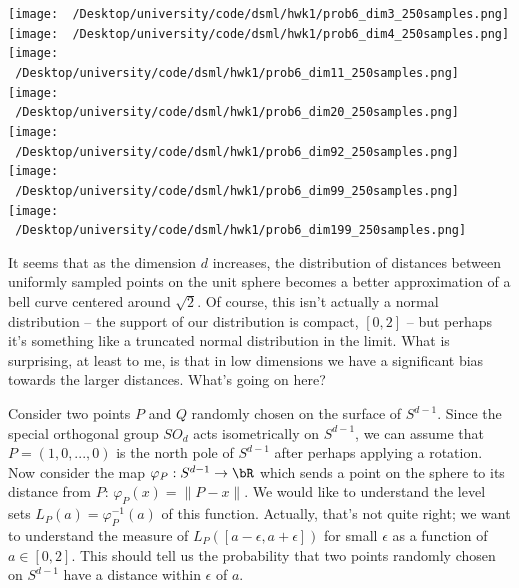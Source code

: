 \begin{homework}[e]
\begin{soln}
\begin{center}
      \texttt{[image: ~/Desktop/university/code/dsml/hwk1/prob6\_dim3\_250samples.png]}
      \texttt{[image: ~/Desktop/university/code/dsml/hwk1/prob6\_dim4\_250samples.png]}
      \texttt{[image: ~/Desktop/university/code/dsml/hwk1/prob6\_dim11\_250samples.png]}
      \texttt{[image: ~/Desktop/university/code/dsml/hwk1/prob6\_dim20\_250samples.png]}
      \texttt{[image: ~/Desktop/university/code/dsml/hwk1/prob6\_dim92\_250samples.png]}
      \texttt{[image: ~/Desktop/university/code/dsml/hwk1/prob6\_dim99\_250samples.png]}
      \texttt{[image: ~/Desktop/university/code/dsml/hwk1/prob6\_dim199\_250samples.png]}
      \label{fig:prob6-3}
    \end{center}
    It seems that as the dimension $d$ increases, the distribution of distances between uniformly sampled points on the unit sphere becomes a better approximation of a bell curve centered around $\sqrt{2}$. Of course, this isn't actually a normal distribution -- the support of our distribution is compact, $[0,2]$ -- but perhaps it's something like a truncated normal distribution in the limit. What is surprising, at least to me, is that in low dimensions we have a significant bias towards the larger distances. What's going on here?

    Consider two points $P$ and $Q$ randomly chosen on the surface of $S^{d-1}$. Since the special orthogonal group $SO_{d}$ acts isometrically on $S^{d-1}$, we can assume that $P = (1,0,...,0)$ is the north pole of $S^{d-1}$ after perhaps applying a rotation. Now consider the map $\varphi_P:S^{d-1}\to \bR$ which sends a point on the sphere to its distance from $P$: $\varphi_P(x) = \|P - x\|$. We would like to understand the level sets $L_P(a) = \varphi^{-1}_P(a)$ of this function. Actually, that's not quite right; we want to understand the measure of $L_P([a - \epsilon, a+\epsilon])$ for small $\epsilon$ as a function of $a \in [0,2]$. This should tell us the probability that two points randomly chosen on $S^{d-1}$ have a distance within $\epsilon$ of $a$.


\end{soln}
\end{homework}
